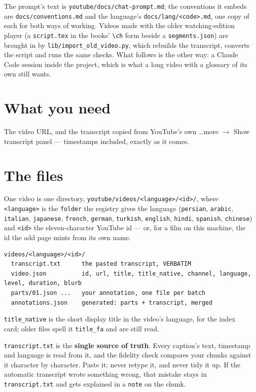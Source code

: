 \documentclass[11pt,oneside]{report}
\newcommand{\file}[1]{\texttt{#1}}
\newcommand{\menu}[1]{\textsf{#1}}
\begin{document}
The prompt's text is \file{youtube/docs/chat-prompt.md}; the conventions it
embeds are \file{docs/conventions.md} and the language's
\file{docs/lang/<code>.md}, one copy of each for both ways of working.
Videos made with the older watching-edition player (a \file{script.tex} in
the books' \verb|\ch| form beside a \file{segments.json}) are brought in by
\file{lib/import\_old\_video.py}, which rebuilds the transcript, converts
the script and runs the same checks.
What follows is the other way: a Claude Code session inside the project,
which is what a long video with a glossary of its own still wants.

\section{What you need}

The video URL, and the transcript copied from YouTube's own
\menu{\ldots more $\rightarrow$ Show transcript} panel --- timestamps
included, exactly as it comes.

\section{The files}

One video is one directory, \file{youtube/videos/<language>/<id>/},
where \texttt{<language>} is the \texttt{folder} the registry gives the
language (\texttt{persian}, \texttt{arabic}, \texttt{italian},
\texttt{japanese}, \texttt{french}, \texttt{german}, \texttt{turkish},
\texttt{english}, \texttt{hindi}, \texttt{spanish}, \texttt{chinese}) and
\texttt{<id>} the eleven-character YouTube id --- or, for a film on this
machine, the id the add page mints from its own name.

\begin{lstlisting}
videos/<language>/<id>/
  transcript.txt      the pasted transcript, VERBATIM
  video.json          id, url, title, title_native, channel, language, level, duration, blurb
  parts/01.json ...   your annotation, one file per batch
  annotations.json    generated: parts + transcript, merged
\end{lstlisting}

\texttt{title\_native} is the short display title in the video's language,
for the index card; older files spell it \texttt{title\_fa} and are still
read.

\begin{warnbox}
\file{transcript.txt} is the \textbf{single source of truth}. Every
caption's text, timestamp and language is read from it, and the fidelity
check compares your chunks against it character by character. Paste it;
never retype it, and never tidy it up. If the automatic transcript wrote
something wrong, that mistake stays in \file{transcript.txt} and gets
explained in a \texttt{note} on the chunk.
\end{warnbox}
\end{document}
